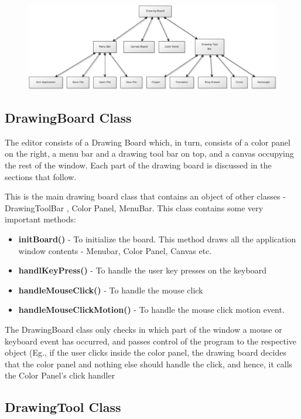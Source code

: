 \documentclass[12pt]{report}
\begin{document}
\begin{figure}[h!]
	\centering
		\includegraphics[scale=0.4]{classdesign.png}
\end{figure}

\subsection{DrawingBoard Class}

The editor consists of a Drawing Board which, in turn, consists of a color panel on the right, a menu bar and a drawing tool bar on top, and a canvas occupying the rest of the window. Each part of the drawing board is discussed in the sections that follow.



This is the main drawing board class that contains an object of other classes - DrawingToolBar , Color Panel, MenuBar. This class contains some very important methods:

\begin{itemize}
\item{\textbf{initBoard()} - To initialize the board. This method draws all the application window contents - Menubar, Color Panel, Canvas etc.}
\item{\textbf{handlKeyPress()} - To handle the user key presses on the keyboard}
\item{\textbf{handleMouseClick() }- To handle the mouse click}
\item{\textbf{handleMouseClickMotion()} - To handle the mouse click motion} event.
\end{itemize}
The DrawingBoard class only checks in which part of the window a mouse or keyboard event has occurred, and passes control of the program to the respective object (Eg., if the user clicks inside the color panel, the drawing board decides that the color panel and nothing else should handle the click, and hence, it calls the Color Panel’s click handler



\subsection{DrawingTool Class}
\end{document}
